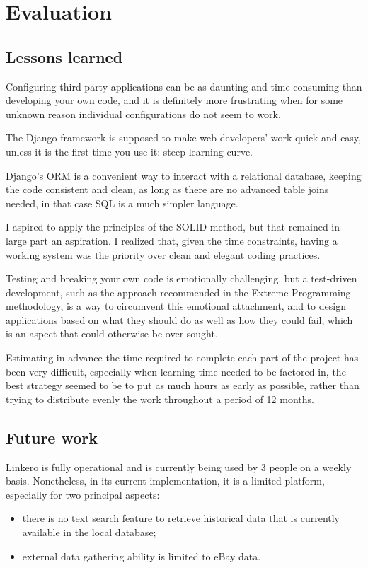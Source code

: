 \chapter{Evaluation}

\section{Lessons learned}
Configuring third party applications can be as daunting and time consuming than
developing your own code, and it is definitely more frustrating when for some
unknown reason individual configurations do not seem to work.

The Django framework is supposed to make web-developers' work quick and easy,
unless it is the first time you use it: steep learning curve.

Django's ORM is a convenient way to interact with a relational database, keeping
the code consistent and clean, as long as there are no advanced table joins
needed, in that case SQL is a much simpler language.

I aspired to apply the principles of the SOLID method, but that remained in
large part an aspiration. I realized that, given the time constraints, having a
working system was the priority over clean and elegant coding practices.

Testing and breaking your own code is emotionally challenging, but a test-driven
development, such as the approach recommended in the Extreme Programming
methodology, is a way to circumvent this emotional attachment, and to design
applications based on what they should do as well as how they could fail, which
is an aspect that could otherwise be over-sought.

Estimating in advance the time required to complete each part of the project has
been very difficult, especially when learning time needed to be factored in, the
best strategy seemed to be to put as much hours as early as possible, rather
than trying to distribute evenly the work throughout a period of 12 months.

\section{Future work}
Linkero is fully operational and is currently being used by 3 people on a weekly
basis. Nonetheless, in its current implementation, it is a limited platform,
especially for two principal aspects:
\begin{itemize}
  \item there is no text search feature to retrieve historical data that is
  currently available in the local database;
  \item external data gathering ability is limited to eBay data.
\end{itemize}

